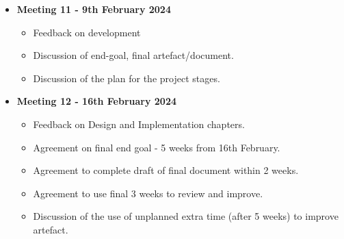 \begin{itemize}
\begin{itemize}
    \end{itemize}
    \item \textbf{Meeting 11 - 9th February 2024}
    \begin{itemize}
        \item Feedback on development
        \item Discussion of end-goal, final artefact/document.
        \item Discussion of the plan for the project stages.
    \end{itemize}
    \item \textbf{Meeting 12 - 16th February 2024}
    \begin{itemize}
        \item Feedback on Design and Implementation chapters.
        \item Agreement on final end goal - 5 weeks from 16th February.
        \item Agreement to complete draft of final document within 2 weeks.
        \item Agreement to use final 3 weeks to review and improve.
        \item Discussion of the use of unplanned extra time (after 5 weeks) to improve artefact.
    \end{itemize}
\end{itemize}